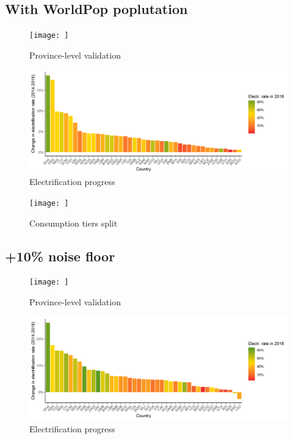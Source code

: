 \documentclass[preprint,12pt]{elsarticle}
\begin{document}
\subsection*{With WorldPop poplutation}

\begin{figure}[H]
    \centering
    \texttt{[image: ]}
    \caption{Province-level validation}
\end{figure}

\begin{figure}[H]
    \centering
    \includegraphics[scale=0.7]{figures/barplot_wp.png}
    \caption{Electrification progress}
\end{figure}

\begin{figure}[H]
    \centering
    \texttt{[image: ]}
    \caption{Consumption tiers split}
\end{figure}


\subsection*{+10\% noise floor}

\begin{figure}[H]
    \centering
    \texttt{[image: ]}
    \caption{Province-level validation}
\end{figure}

\begin{figure}[H]
    \centering
    \includegraphics[scale=0.7]{figures/barplot_plus10.png}
    \caption{Electrification progress}
\end{figure}
\end{document}
